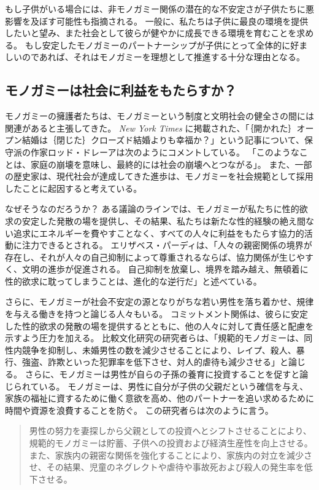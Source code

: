 \documentclass[paper=a4,book,openany]{jlreq}
\begin{document}
もし子供がいる場合には、非モノガミー関係の潜在的な不安定さが子供たちに悪影響を及ぼす可能性も指摘される。
一般に、私たちは子供に最良の環境を提供したいと望み、また社会として彼らが健やかに成長できる環境を育むことを求める。
もし安定したモノガミーのパートナーシップが子供にとって全体的に好ましいのであれば、それはモノガミーを理想として推進する十分な理由となる。

\subsection{モノガミーは社会に利益をもたらすか？}

モノガミーの擁護者たちは、モノガミーという制度と文明社会の健全さの間には関連があると主張してきた。
\emph{New York Times} に掲載された、「｛開かれた｝{オープン}結婚は｛閉じた｝{クローズド}結婚よりも幸福か？」という記事について、保守派の作家ロッド・ドレーアは次のようにコメントしている。
「このようなことは、家庭の崩壊を意味し、最終的には社会の崩壊へとつながる」\citep{dreher17:_perver_progr}。
また、一部の歴史家は、現代社会が達成してきた進歩は、モノガミーを社会規範として採用したことに起因すると考えている。

なぜそうなのだろうか？ ある議論のラインでは、モノガミーが私たちに性的欲求の安定した発散の場を提供し、その結果、私たちは新たな性的経験の絶え間ない追求にエネルギーを費やすことなく、すべての人々に利益をもたらす協力的活動に注力できるとされる。
エリザベス・パーディは、「人々の親密関係の境界が存在し、それが人々の自己抑制によって尊重されるならば、協力関係が生じやすく、文明の進歩が促進される。
自己抑制を放棄し、境界を踏み越え、無頓着に性的欲求に耽ってしまうことは、進化的な逆行だ」と述べている\citep{pardi19:_no_human_being_arent_happier}。

さらに、モノガミーが社会不安定の源となりがちな若い男性を落ち着かせ、規律を与える働きを持つと論じる人々もいる。
コミットメント関係は、彼らに安定した性的欲求の発散の場を提供するとともに、他の人々に対して責任感と配慮を示すよう圧力を加える。
比較文化研究の研究者らは、「規範的モノガミーは、同性内競争を抑制し、未婚男性の数を減少させることにより、レイプ、殺人、暴行、強盗、詐欺といった犯罪率を低下させ、対人的虐待も減少させる」と論じる\citep[p.657]{henrich12:_puzzl_monog_marriag}。
さらに、モノガミーは男性が自らの子孫の養育に投資することを促すと論じられている。
モノガミーは、男性に自分が子供の父親だという確信を与え、家族の福祉に資するために働く意欲を高め、他のパートナーを追い求めるために時間や資源を浪費することを防ぐ。
この研究者らは次のように言う。

\begin{quote}
男性の努力を妻探しから父親としての投資へとシフトさせることにより、規範的モノガミーは貯蓄、子供への投資および経済生産性を向上させる。
また、家族内の親密な関係を強化することにより、家族内の対立を減少させ、その結果、児童のネグレクトや虐待や事故死および殺人の発生率を低下させる。
\citep[p.657]{henrich12:_puzzl_monog_marriag}
\end{quote}
\end{document}
